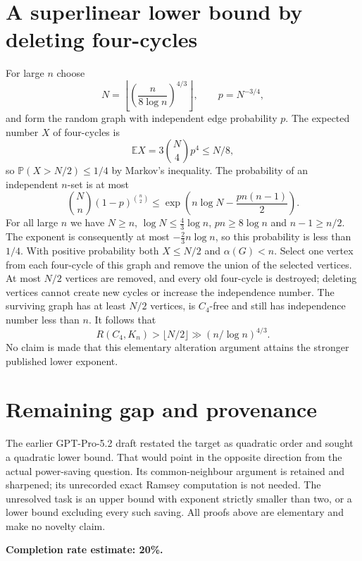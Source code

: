\documentclass[11pt]{article}
\begin{document}
\section*{A superlinear lower bound by deleting four-cycles}
For large $n$ choose
\[
 N=\left\lfloor\left(\frac{n}{8\log n}\right)^{4/3}\right\rfloor,
 \qquad p=N^{-3/4},
\]
and form the random graph with independent edge probability $p$. The expected number $X$ of four-cycles is
\[
 \mathbb EX=3\binom N4p^4\le N/8,
\]
so $\mathbb P(X>N/2)\le1/4$ by Markov's inequality.
The probability of an independent $n$-set is at most
\[
 \binom Nn(1-p)^{\binom n2}
 \le\exp\left(n\log N-\frac{pn(n-1)}2\right).
\]
For all large $n$ we have $N\ge n$, $\log N\le\tfrac43\log n$, $pn\ge8\log n$ and $n-1\ge n/2$. The exponent is consequently at most $-\tfrac23n\log n$, so this probability is less than $1/4$.
With positive probability both $X\le N/2$ and $\alpha(G)<n$. Select one vertex from each four-cycle of this graph and remove the union of the selected vertices. At most $N/2$ vertices are removed, and every old four-cycle is destroyed; deleting vertices cannot create new cycles or increase the independence number. The surviving graph has at least $N/2$ vertices, is $C_4$-free and still has independence number less than $n$. It follows that
\[
 R(C_4,K_n)>\lfloor N/2\rfloor
 \gg(n/\log n)^{4/3}.
\]
No claim is made that this elementary alteration argument attains the stronger published lower exponent.

\section*{Remaining gap and provenance}
The earlier GPT-Pro-5.2 draft restated the target as quadratic order and sought a quadratic lower bound. That would point in the opposite direction from the actual power-saving question. Its common-neighbour argument is retained and sharpened; its unrecorded exact Ramsey computation is not needed. The unresolved task is an upper bound with exponent strictly smaller than two, or a lower bound excluding every such saving. All proofs above are elementary and make no novelty claim.

\textbf{Completion rate estimate: 20\%.}
\end{document}
